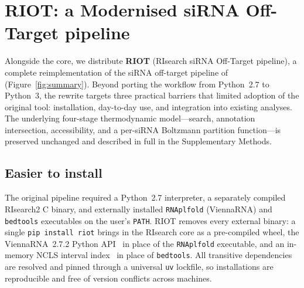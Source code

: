 

\section{RIOT: a Modernised siRNA Off-Target pipeline}\label{sec:pipeline}

Alongside the core, we distribute \textbf{RIOT} (RIsearch siRNA Off-Target
pipeline), a complete reimplementation of the siRNA off-target pipeline of
\citet{alkan2017risearch2}
(Figure~\ref{fig:summary}). Beyond porting the workflow from Python~2.7 to
Python~3, the rewrite targets three practical barriers that limited adoption of
the original tool: installation, day-to-day use, and integration into existing
analyses. The underlying four-stage thermodynamic model---search, annotation
intersection, accessibility, and a per-siRNA Boltzmann partition function---is
preserved unchanged and described in full in the Supplementary Methods.

\subsection*{Easier to install}

The original pipeline required a Python~2.7 interpreter, a separately compiled
RIsearch2 C binary, and externally installed \texttt{RNAplfold} (ViennaRNA) and
\texttt{bedtools} executables on the user's \texttt{PATH}. RIOT removes
every external binary: a single \texttt{pip install riot} brings in
the RIsearch core as a pre-compiled wheel, the ViennaRNA~2.7.2 Python
API~\citep{lorenz2011vienna} in place of the \texttt{RNAplfold} executable, and
an in-memory NCLS interval index~\citep{ncls} in place of \texttt{bedtools}. All
transitive dependencies are resolved and pinned through a universal \texttt{uv}
lockfile, so installations are reproducible and free of version conflicts across
machines.

